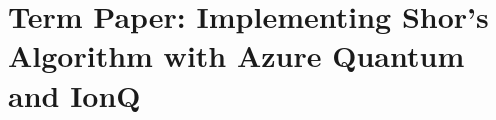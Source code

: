 \begin{comment}
\section{Module 10: Algorithms, part I - oracle problems Notes}


\section{Module 1 Quantum Strangeness Questions}


\section{Module 2 Quantum Linear Algebra, Part I Questions}


\section{Module 3 The Single Qubit Questions}


\section{Module 4: Quantum linear algebra, part II Questions}


\section{Module 5: Multiple qubits, part I Questions}


\section{Module 6: Multiple qubits, part II Questions}


\section{Module 7: Interlude: Principles of quantum mechanics Questions}


\section{Module 8: Quantum circuits - reversible construction Questions}


%

\section{Module 10: Algorithms, part I Questions}


\end{comment}

\section{Term Paper: Implementing Shor's Algorithm with Azure Quantum and IonQ} 



